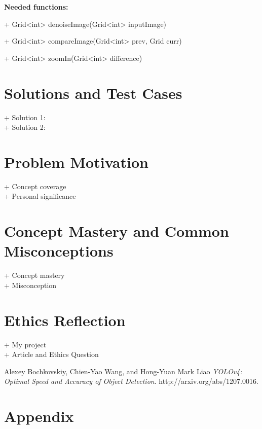 \documentclass[]{article}
\begin{document}
	\textbf{Needed functions:} \par
	+ Grid<int> denoiseImage(Grid<int> inputImage) \par
	+ Grid<int> compareImage(Grid<int> prev, Grid curr) \par
	+ Grid<int> zoomIn(Grid<int> difference) \par
	
	\section{Solutions and Test Cases}
	+ Solution 1: \\
	+ Solution 2: \par
	
	\section{Problem Motivation}
	+ Concept coverage \\
	+ Personal significance \par
	
	\section{Concept Mastery and Common Misconceptions}
	+ Concept mastery \\
	+ Misconception \par
	
	\section{Ethics Reflection}
	+ My project \\
	+ Article and Ethics Question \par
	
	\begin{thebibliography}{1}
		Alexey Bochkovskiy, Chien-Yao Wang, and Hong-Yuan Mark Liao 
		\textit{YOLOv4: Optimal Speed and Accuracy of Object Detection}. 
		http://arxiv.org/abs/1207.0016.
		
		
	\end{thebibliography}
	
	
	
	
	\section{Appendix}
	
	
\end{document}
